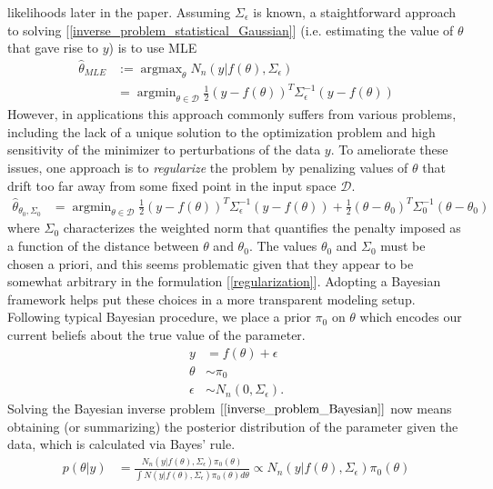 \documentclass[12pt]{article}
\DeclareMathOperator*{\argmax}{argmax}
\DeclareMathOperator*{\argmin}{argmin}
\begin{document}
likelihoods later in the paper. Assuming $\Sigma_\epsilon$ is known, a staightforward approach to solving [\ref{inverse_problem_statistical_Gaussian}] (i.e. estimating the value of $\theta$ 
that gave rise to $y$) is to use MLE
\begin{align}
\hat{\theta}_{MLE} &:= \argmax_{\theta} N_n(y|f(\theta), \Sigma_\epsilon) \\
			     &= \argmin_{\theta \in \mathcal{D}} \frac{1}{2} (y - f(\theta))^T \Sigma_\epsilon^{-1} (y - f(\theta)) \nonumber
\end{align}
However, in applications this approach commonly suffers from various problems, including the lack of a unique solution to the optimization problem and high sensitivity of the minimizer to perturbations of 
the data $y$. To ameliorate these issues, one approach is to \textit{regularize} the problem by penalizing values of $\theta$ that drift too far away from some fixed point in the input space $\mathcal{D}$. 
\begin{align}
\hat{\theta}_{\theta_0, \Sigma_0} &= \argmin_{\theta \in \mathcal{D}} \frac{1}{2} (y - f(\theta))^T \Sigma_\epsilon^{-1} (y - f(\theta)) + \frac{1}{2} (\theta - \theta_0)^T \Sigma_0^{-1}(\theta - \theta_0) \label{regularization}
\end{align}
where $\Sigma_0$ characterizes the weighted norm that quantifies the penalty imposed as a function of the distance between $\theta$ and $\theta_0$. The values $\theta_0$ and $\Sigma_0$ must be chosen 
a priori, and this seems problematic given that they appear to be somewhat arbitrary in the formulation [\ref{regularization}]. Adopting a Bayesian framework helps put these choices in a more transparent 
modeling setup. Following typical Bayesian procedure, we place a prior $\pi_0$ on $\theta$ which encodes our current beliefs about the true value of the parameter. 
\begin{align}
y &= f(\theta) + \epsilon \label{inverse_problem_Bayesian} \\
\theta &\sim \pi_0 \\
\epsilon &\sim N_n(0, \Sigma_\epsilon) \nonumber.
\end{align}
Solving the Bayesian inverse problem $[\ref{inverse_problem_Bayesian}]$ now means obtaining (or summarizing) the posterior distribution of the parameter given the data, which is calculated via Bayes' rule. 
\begin{align}
p(\theta|y) &= \frac{N_n(y|f(\theta), \Sigma_\epsilon)\pi_0(\theta)}{\int N(y|f(\theta), \Sigma_\epsilon)\pi_0(\theta) d\theta} \propto N_n(y|f(\theta), \Sigma_\epsilon)\pi_0(\theta) \label{posterior}
\end{align}
\end{document}
